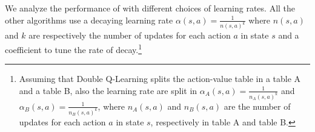 \documentclass[conference]{IEEEtran}
\begin{document}
We analyze the performance of \alg with different choices of learning rates. All the other algorithms use a decaying learning rate $\alpha(s, a) = \frac{1}{n(s, a)^{k}}$ where $n(s, a)$ and $k$ are respectively the number of updates for each action $a$ in state $s$ and a coefficient to tune the rate of decay.\footnote{Assuming that Double Q-Learning splits the action-value table in a table A and a table B, also the learning rate are split in $\alpha_A(s, a) = \frac{1}{n_A(s, a)^{k}}$ and $\alpha_B(s, a) = \frac{1}{n_B(s, a)^{k}}$, where $n_A(s, a)$ and $n_B(s, a)$ are the number of updates for each action $a$ in state $s$, respectively in table A and table B.}
\begin{figure}[t]
\begin{minipage}{\columnwidth}
\centering
  \hspace{-.5cm}

\end{minipage}
\end{figure}
\end{document}

